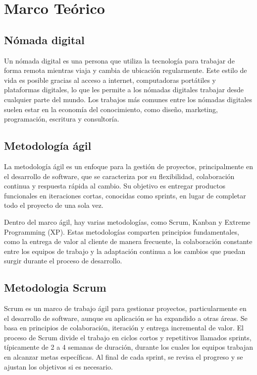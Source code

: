 \section{Marco Teórico}

\subsection{Nómada digital}

 Un nómada digital es una persona que utiliza la tecnología para trabajar de forma remota mientras viaja y cambia de ubicación regularmente. Este estilo de vida es posible gracias al acceso a internet, computadoras portátiles y plataformas digitales, lo que les permite a los nómadas digitales trabajar desde cualquier parte del mundo. Los trabajos más comunes entre los nómadas digitales suelen estar en la economía del conocimiento, como diseño, marketing, programación, escritura y consultoría.\cite{NomDig}



\subsection{Metodología ágil}

La metodología ágil es un enfoque para la gestión de proyectos, principalmente en el desarrollo de software, que se caracteriza por su flexibilidad, colaboración continua y respuesta rápida al cambio. Su objetivo es entregar productos funcionales en iteraciones cortas, conocidas como sprints, en lugar de completar todo el proyecto de una sola vez. 

Dentro del marco ágil, hay varias metodologías, como Scrum, Kanban y Extreme Programming (XP). Estas metodologías comparten principios fundamentales, como la entrega de valor al cliente de manera frecuente, la colaboración constante entre los equipos de trabajo y la adaptación continua a los cambios que puedan surgir durante el proceso de desarrollo. \cite{MetAgil}

\subsection{Metodologia Scrum }

Scrum es un marco de trabajo ágil para gestionar proyectos, particularmente en el desarrollo de software, aunque su aplicación se ha expandido a otras áreas. Se basa en principios de colaboración, iteración y entrega incremental de valor. El proceso de Scrum divide el trabajo en ciclos cortos y repetitivos llamados sprints, típicamente de 2 a 4 semanas de duración, durante los cuales los equipos trabajan en alcanzar metas específicas. Al final de cada sprint, se revisa el progreso y se ajustan los objetivos si es necesario.\cite{Scrum}

